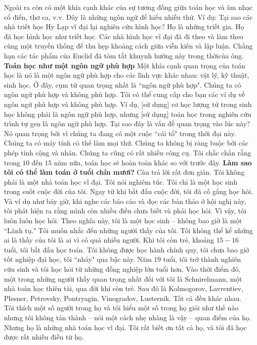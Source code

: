 \begin{multicols}{2}
	\vskip 0.1cm
	Ngoài ra còn có một khía cạnh khác của sự tương đồng giữa toán học và âm nhạc cổ điển, thơ ca, v.v. Đây là những ngôn ngữ để hiểu nhiều thứ. Ví dụ: Tại sao các nhà triết học Hy Lạp vĩ đại lại nghiên cứu hình học? Họ là những triết gia. Họ đã học hình học như triết học. Các nhà hình học vĩ đại đã đi theo và làm theo cùng một truyền thống để thu hẹp khoảng cách giữa viễn kiến và lập luận. Chẳng hạn các tác phẩm của Euclid đã tóm tắt khuynh hướng này trong thời\linebreak của ông.  
	\vskip 0.1cm
	\textbf{\color{quantoan}Toán học như một ngôn ngữ phù hợp}
	\vskip 0.1cm
	Một khía cạnh quan trọng của toán học là nó là một ngôn ngữ phù hợp cho các lĩnh vực khác nhau: vật lý, kỹ thuật, sinh học. Ở đây, cụm từ quan trọng nhất là ``ngôn ngữ phù hợp". Chúng ta có ngôn ngữ phù hợp và không phù hợp. Tôi có thể cung cấp cho bạn các ví dụ về ngôn ngữ phù hợp và không phù hợp. Ví dụ, [sử dụng] cơ học lượng tử trong sinh học không phải là ngôn ngữ phù hợp, nhưng [sử dụng] toán học trong nghiên cứu trình tự gen là ngôn ngữ phù hợp.  
	\vskip 0.1cm
	Tại sao đây là vấn đề quan trọng vào lúc này? Nó quan trọng bởi vì chúng ta đang có một cuộc ``cái tổ" trong thời đại này. Chúng ta có máy tính có thể làm mọi thứ. Chúng ta không bị ràng buộc bởi các phép tính cộng và nhân. Chúng ta cũng có rất nhiều công cụ. Tôi chắc chắn rằng trong $10$ đến $15$ năm nữa, toán học sẽ hoàn toàn khác so với trước đây.
	\vskip 0.1cm
	\textbf{\color{quantoan}Làm sao tôi có thể làm toán ở tuổi chín mươi?}
	\vskip 0.05cm
	Câu trả lời rất đơn giản. Tôi không phải là một nhà toán học vĩ đại. Tôi nói nghiêm túc. Tôi chỉ là một học sinh trong suốt cuộc đời của tôi. Ngay từ khi bắt đầu cuộc đời, tôi đã cố gắng học hỏi. Và ví dụ như bây giờ, khi nghe các báo cáo và đọc các bản thảo ở hội nghị này, tôi phát hiện ra rằng mình còn nhiều điều chưa biết và phải học hỏi. Vì vậy, tôi luôn luôn học hỏi. Theo nghĩa này, tôi là một học sinh -- không bao giờ là một \linebreak ``Lãnh tụ."
	\vskip 0.05cm
	Tôi muốn nhắc đến những người thầy của tôi. Tôi không thể kể những ai là thầy của tôi là ai vì có quá nhiều người. Khi tôi còn trẻ, khoảng $15-16$ tuổi, tôi bắt đầu học toán. Tôi không được học hành chính quy, tôi chưa bao giờ tốt nghiệp đại học, tôi ``nhảy" qua bậc này. Năm $19$ tuổi, tôi trở thành nghiên cứu sinh và tôi học hỏi từ những đồng nghiệp lớn tuổi hơn.
	\vskip 0.05cm
	Vào thời điểm đó, một trong những người thầy quan trọng nhất đối với tôi là Schnirelmann, một nhà toán học thiên tài, qua đời khi còn trẻ. Sau đó là Kolmogorov, Lavrentiev, Plesner, Petrovsky, Pontryagin, Vinogradov, Lusternik. Tất cả đều khác nhau. Tôi thích một số người trong họ và tôi hiểu một số trong họ giỏi như thế nào nhưng tôi không tán thành -- nói một cách nhẹ nhàng là vậy -- quan điểm của họ. Nhưng họ là những nhà toán học vĩ đại. Tôi rất biết ơn tất cả họ, và tôi đã học được rất nhiều điều từ họ.

\end{multicols}
